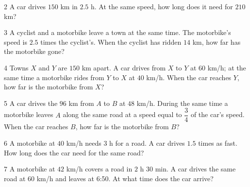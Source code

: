 \gap
\begin{probbox}{2}{\relax}
A car drives $150$ km in $2.5$ h. At the same speed, how long does it need for $210$ km?
\end{probbox}
\gap
\begin{probbox}{3}{\relax}
A cyclist and a motorbike leave a town at the same time. The motorbike's speed is $2.5$ times the cyclist's. When the cyclist has ridden $14$ km, how far has the motorbike gone?
\end{probbox}
\gap
\begin{probbox}{4}{\relax}
Towns $X$ and $Y$ are $150$ km apart. A car drives from $X$ to $Y$ at $60$ km/h; at the same time a motorbike rides from $Y$ to $X$ at $40$ km/h. When the car reaches $Y$, how far is the motorbike from $X$?
\end{probbox}
\gap
\begin{probbox}{5}{\relax}
A car drives the $96$ km from $A$ to $B$ at $48$ km/h. During the same time a motorbike leaves $A$ along the same road at a speed equal to $\dfrac34$ of the car's speed. When the car reaches $B$, how far is the motorbike from $B$?
\end{probbox}
\gap
\begin{probbox}{6}{\relax}
A motorbike at $40$ km/h needs $3$ h for a road. A car drives $1.5$ times as fast. How long does the car need for the same road?
\end{probbox}
\gap
\begin{probbox}{7}{\relax}
A motorbike at $42$ km/h covers a road in $2$ h $30$ min. A car drives the same road at $60$ km/h and leaves at 6:50. At what time does the car arrive?
\end{probbox}
